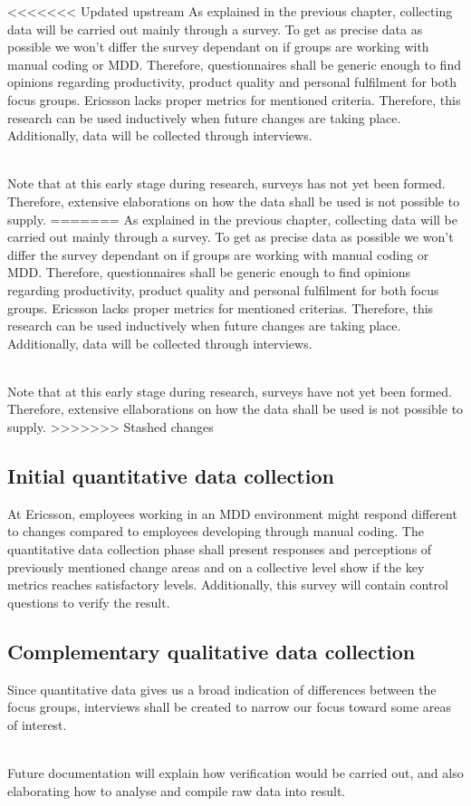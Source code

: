 \documentclass[ProjectPlan_innit.tex]{subfiles}
\begin{document}
<<<<<<< Updated upstream
As explained in the previous chapter, collecting data will be carried out mainly through a survey. To get as precise data as possible we won't differ the survey dependant on if groups are working with manual coding or MDD. Therefore, questionnaires shall be generic enough to find opinions regarding productivity, product quality and personal fulfilment for both focus groups. Ericsson lacks proper metrics for mentioned criteria. Therefore, this research can be used inductively when future changes are taking place. Additionally, data will be collected through interviews.

\hspace{0pt}\\ Note that at this early stage during research, surveys has not yet been formed. Therefore, extensive elaborations on how the data shall be used is not possible to supply. 
=======
As explained in the previous chapter, collecting data will be carried out mainly through a survey. To get as precise data as possible we won't differ the survey dependant on if groups are working with manual coding or MDD. Therefore, questionnaires shall be generic enough to find opinions regarding productivity, product quality and personal fulfilment for both focus groups. Ericsson lacks proper metrics for mentioned criterias. Therefore, this research can be used inductively when future changes are taking place. Additionally, data will be collected through interviews.

\hspace{0pt}\\ Note that at this early stage during research, surveys have not yet been formed. Therefore, extensive ellaborations on how the data shall be used is not possible to supply. 
>>>>>>> Stashed changes

\subsection{Initial quantitative data collection}
At Ericsson, employees working in an MDD environment might respond different to changes compared to employees developing through manual coding. The quantitative data collection phase shall present responses and perceptions of previously mentioned change areas and on a collective level show if the key metrics reaches satisfactory levels. Additionally, this survey will contain control questions to verify the result.

\subsection{Complementary qualitative data collection}
Since quantitative data gives us a broad indication of differences between the focus groups, interviews shall be created to narrow our focus toward some areas of interest. 

\hspace{0pt}\\ Future documentation will explain how verification would be carried out, and also elaborating how to analyse and compile raw data into result.
\end{document}
